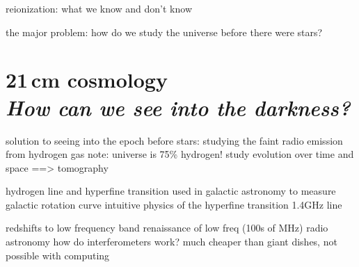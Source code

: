reionization: what we know and don't know

the major problem: how do we study the universe before there were stars?

\section[21\,cm cosmology. \emph{How can we see into the darkness?}]{21\,cm cosmology\\ \emph{\large{How can we see into the darkness?}}}

solution to seeing into the epoch before stars: studying the faint radio emission from hydrogen gas
note: universe is 75\% hydrogen!
study evolution over time and space ==> tomography

hydrogen line and hyperfine transition
used in galactic astronomy to measure galactic rotation curve
intuitive physics of the hyperfine transition
1.4GHz line

redshifts to low frequency band
renaissance of low freq (100s of MHz) radio astronomy
how do interferometers work?
much cheaper than giant dishes, not possible with computing


